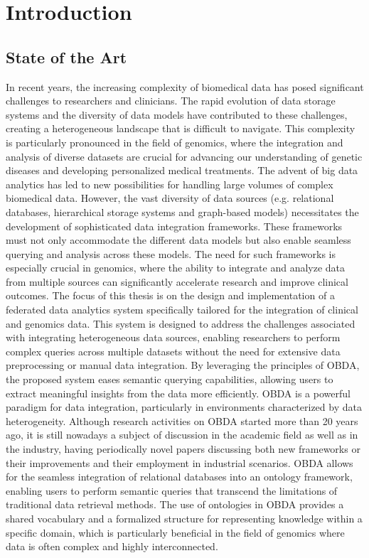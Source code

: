 
\chapter{Introduction}
\label{chp:intro}

\section{State of the Art}
In recent years, the increasing complexity of biomedical data has posed significant challenges to researchers and clinicians. The rapid evolution of data storage systems and the diversity of data models have contributed to these challenges, creating a heterogeneous landscape that is difficult to navigate. This complexity is particularly pronounced in the field of genomics, where the integration and analysis of diverse datasets are crucial for advancing our understanding of genetic diseases and developing personalized medical treatments.
The advent of big data analytics has led to new possibilities for handling large volumes of complex biomedical data. However, the vast diversity of data sources (e.g. relational databases, hierarchical storage systems and graph-based models) necessitates the development of sophisticated data integration frameworks. These frameworks must not only accommodate the different data models but also enable seamless querying and analysis across these models. The need for such frameworks is especially crucial in genomics, where the ability to integrate and analyze data from multiple sources can significantly accelerate research and improve clinical outcomes.
The focus of this thesis is on the design and implementation of a federated data analytics system specifically tailored for the integration of clinical and genomics data. This system is designed to address the challenges associated with integrating heterogeneous data sources, enabling researchers to perform complex queries across multiple datasets without the need for extensive data preprocessing or manual data integration. By leveraging the principles of \ac{OBDA}, the proposed system eases semantic querying capabilities, allowing users to extract meaningful insights from the data more efficiently.
\ac{OBDA} is a powerful paradigm for data integration, particularly in environments characterized by data heterogeneity. Although research activities on \ac{OBDA} started more than 20 years ago, it is still nowadays a subject of discussion in the academic field as well as in the industry, having periodically novel papers discussing both new frameworks or their improvements and their employment in industrial scenarios. \ac{OBDA} allows for the seamless integration of relational databases into an ontology framework, enabling users to perform semantic queries that transcend the limitations of traditional data retrieval methods. The use of ontologies in \ac{OBDA} provides a shared vocabulary and a formalized structure for representing knowledge within a specific domain, which is particularly beneficial in the field of genomics where data is often complex and highly interconnected.
